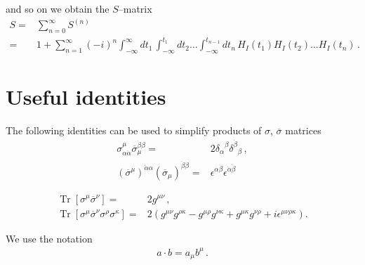 and so on we obtain the $S$--matrix
\begin{align}
  S=&\sum_{n=0}^\infty S^{(n)}\nonumber\\
  =&1+\sum_{n=1}^\infty(-i)^n\int_{-\infty}^{\infty}d t_1\,\int_{-\infty}^{t_1} d t_2\ldots\int_{-\infty}^{t_{n-1}}d t_n\,{H}_I(t_1){H}_I(t_2)\ldots{H}_I(t_n)\,.
\end{align}

\section{Useful identities}
The following identities can be used to simplify products of $\sigma$, $\overline{\sigma}$ matrices %
\begin{align}
  \label{eq:sos}
  \sigma^{\mu}_{\alpha\dot{\alpha}}\overline{\sigma}_{\mu}^{\dot{\beta}\beta}=&2{\delta_{\alpha}}^{\beta}{\delta^{\dot{\beta}}}_{\beta}\,,\nonumber\\
  \left( \overline{\sigma}^{\mu} \right)^{\dot{\alpha}\alpha} \left( \overline{\sigma}_{\mu} \right)^{\dot{\beta}\beta}=&\epsilon^{\alpha\beta}\epsilon^{\dot{\alpha}\dot{\beta}}
\end{align}


\begin{align} %
  \label{eq:trss}
  \operatorname{Tr}\left[ \sigma^{\mu}\overline{\sigma}^{\nu} \right]=&2 g^{\mu\nu}\,, \\
  \operatorname{Tr}\left[ \sigma^{\mu}\overline{\sigma}^{\nu}\sigma^{\rho}\sigma^{\kappa} \right]=&
   2 \left(g^{\mu\nu}g^{\rho\kappa}-g^{\mu\rho}g^{\nu\kappa}+g^{\mu\kappa}g^{\nu\rho} +i\epsilon^{\mu\nu\rho\kappa} \right).
\end{align}


We use the notation
\begin{align}
  a\cdot b=a_{\mu}b^{\mu}\,.
\end{align}

